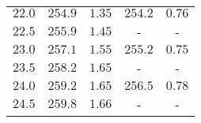 \begin{table}
\begin{tabular}{c c c c c}
        $\num{22.0}$&$\num{254.9}$&$\num{1.35}$&$\num{254.2}$&$\num{0.76}$\\
        $\num{22.5}$&$\num{255.9}$&$\num{1.45}$&-&-\\
        $\num{23.0}$&$\num{257.1}$&$\num{1.55}$&$\num{255.2}$&$\num{0.75}$\\
        $\num{23.5}$&$\num{258.2}$&$\num{1.65}$&-&-\\
        $\num{24.0}$&$\num{259.2}$&$\num{1.65}$&$\num{256.5}$&$\num{0.78}$\\
        $\num{24.5}$&$\num{259.8}$&$\num{1.66}$&-&-\\  
        \bottomrule                                                                                                                                                                                                                                                                                                                                                                                                                                                                                                                                                                                                                                                      
    \end{tabular}
\end{table}

